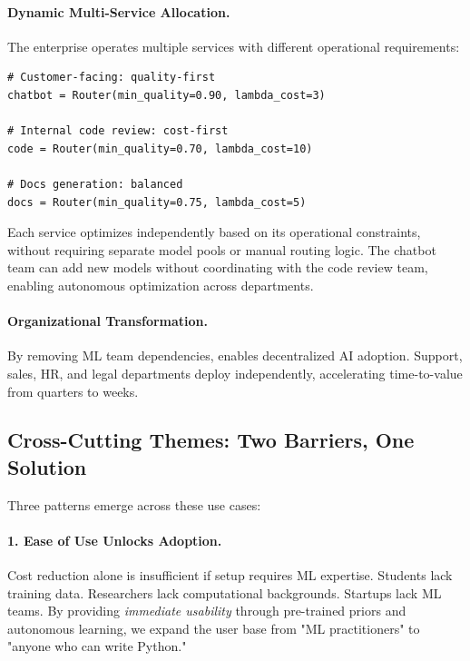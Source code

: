\paragraph{Dynamic Multi-Service Allocation.}
The enterprise operates multiple services with different operational requirements:

\begin{small}
\begin{verbatim}
# Customer-facing: quality-first
chatbot = Router(min_quality=0.90, lambda_cost=3)

# Internal code review: cost-first
code = Router(min_quality=0.70, lambda_cost=10)

# Docs generation: balanced
docs = Router(min_quality=0.75, lambda_cost=5)
\end{verbatim}
\end{small}

Each service optimizes independently based on its operational constraints, without requiring separate model pools or manual routing logic. The chatbot team can add new models without coordinating with the code review team, enabling autonomous optimization across departments.

\paragraph{Organizational Transformation.} By removing ML team dependencies, \ours{} enables decentralized AI adoption. Support, sales, HR, and legal departments deploy independently, accelerating time-to-value from quarters to weeks.

\subsection{Cross-Cutting Themes: Two Barriers, One Solution}

Three patterns emerge across these use cases:

\paragraph{1. Ease of Use Unlocks Adoption.}
Cost reduction alone is insufficient if setup requires ML expertise. Students lack training data. Researchers lack computational backgrounds. Startups lack ML teams. By providing \emph{immediate usability} through pre-trained priors and autonomous learning, we expand the user base from "ML practitioners" to "anyone who can write Python."

